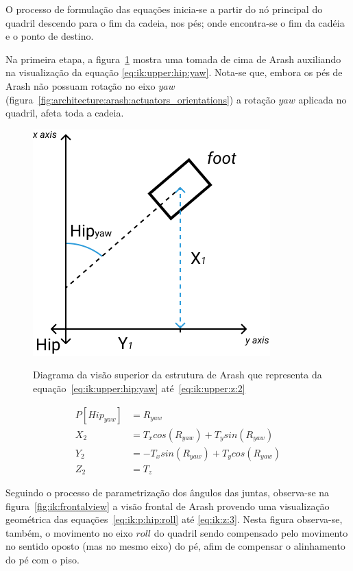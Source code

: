 O processo de formulação das equações inicia-se a partir do nó principal do quadril descendo para o fim da cadeia, nos pés; onde encontra-se o fim da cadéia e o ponto de destino.

Na primeira etapa, a figura~\ref{fig:ik:upperview} mostra uma tomada de cima de Arash auxiliando na visualização da equação \ref{eq:ik:upper:hip:yaw}. Nota-se que, embora os pés de Arash não possuam rotação no eixo $yaw$ (figura~\ref{fig:architecture:arash:actuators_orientations}) a rotação $yaw$ aplicada no quadril, afeta toda a cadeia.

\begin{figure}[htb]
	\centering
	\includegraphics[scale=1.5]{imagens/svg/inverse-kinematics-upperview}
	\caption{Diagrama da visão superior da estrutura de Arash que representa da equação~\ref{eq:ik:upper:hip:yaw} até~\ref{eq:ik:upper:z:2}}
	\caption*{\cite{karimionline}}
	\label{fig:ik:upperview}
\end{figure}

\begin{align}
	P[Hip_{yaw}] &= R_{yaw}                             \label{eq:ik:upper:hip:yaw}  \\
	         X_2 &= T_x cos(R_{yaw}) + T_y sin(R_{yaw})  \label{eq:ik:upper:x:2}      \\
	         Y_2 &= -T_x sin(R_{yaw}) + T_ycos(R_{yaw})   \label{eq:ik:upper:y:2}      \\
	         Z_2 &= T_z                                    \label{eq:ik:upper:z:2}
\end{align}

Seguindo o processo de parametrização dos ângulos das juntas, observa-se na figura~\ref{fig:ik:frontalview} a visão frontal de Arash provendo uma visualização geométrica das equações~\ref{eq:ik:p:hip:roll} até \ref{eq:ik:z:3}. Nesta figura observa-se, também, o movimento no eixo $roll$ do quadril sendo compensado pelo movimento no sentido oposto (mas no mesmo eixo) do pé, afim de compensar o alinhamento do pé com o piso.

